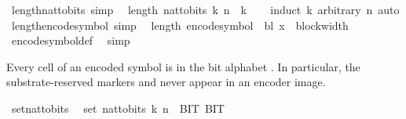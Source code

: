 \begin{isabellebody}
\ length{\isacharunderscore}{\kern0pt}nat{\isacharunderscore}{\kern0pt}to{\isacharunderscore}{\kern0pt}bits\ {\isacharbrackleft}{\kern0pt}simp{\isacharbrackright}{\kern0pt}{\isacharcolon}{\kern0pt}\isanewline
\ \ {\isachardoublequoteopen}length\ {\isacharparenleft}{\kern0pt}nat{\isacharunderscore}{\kern0pt}to{\isacharunderscore}{\kern0pt}bits\ k\ n{\isacharparenright}{\kern0pt}\ {\isacharequal}{\kern0pt}\ k{\isachardoublequoteclose}\isanewline
%
\isadelimproof
\ \ %
\endisadelimproof
%
\isatagproof
{}\isamarkupfalse%
\ {\isacharparenleft}{\kern0pt}induct\ k\ arbitrary{\isacharcolon}{\kern0pt}\ n{\isacharparenright}{\kern0pt}\ auto%
\endisatagproof
{\isafoldproof}%
%
\isadelimproof
\isanewline
%
\endisadelimproof
\isanewline
{}\isamarkupfalse%
\ length{\isacharunderscore}{\kern0pt}encode{\isacharunderscore}{\kern0pt}symbol\ {\isacharbrackleft}{\kern0pt}simp{\isacharbrackright}{\kern0pt}{\isacharcolon}{\kern0pt}\isanewline
\ \ {\isachardoublequoteopen}length\ {\isacharparenleft}{\kern0pt}encode{\isacharunderscore}{\kern0pt}symbol\ {\isasymGamma}\ bl\ x{\isacharparenright}{\kern0pt}\ {\isacharequal}{\kern0pt}\ block{\isacharunderscore}{\kern0pt}width\ {\isasymGamma}{\isachardoublequoteclose}\isanewline
%
\isadelimproof
\ \ %
\endisadelimproof
%
\isatagproof
{}\isamarkupfalse%
\ encode{\isacharunderscore}{\kern0pt}symbol{\isacharunderscore}{\kern0pt}def\ \isamarkupfalse%
\ simp%
\endisatagproof
{\isafoldproof}%
%
\isadelimproof
%
\endisadelimproof
%
\begin{isamarkuptext}%
Every cell of an encoded symbol is in the bit alphabet
  .  In particular, the substrate-reserved
  markers  and  never appear in an
  encoder image.%
\end{isamarkuptext}\isamarkuptrue%
\isamarkupfalse%
\ set{\isacharunderscore}{\kern0pt}nat{\isacharunderscore}{\kern0pt}to{\isacharunderscore}{\kern0pt}bits{\isacharcolon}{\kern0pt}\isanewline
\ \ {\isachardoublequoteopen}set\ {\isacharparenleft}{\kern0pt}nat{\isacharunderscore}{\kern0pt}to{\isacharunderscore}{\kern0pt}bits\ k\ n{\isacharparenright}{\kern0pt}\ {\isasymsubseteq}\ {\isacharbraceleft}{\kern0pt}BIT{}{\isacharcomma}{\kern0pt}\ BIT{}{\isacharbraceright}{\kern0pt}{\isachardoublequoteclose}\isanewline
%
\isadelimproof
\ \ %
\endisadelimproof
%
\isatagproof
{}\isamarkupfalse%

\end{isabellebody}
